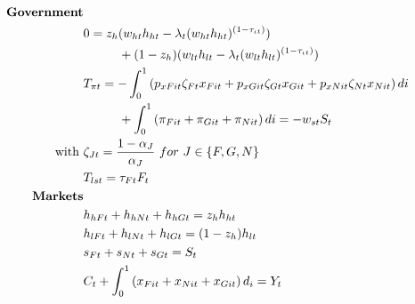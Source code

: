 \begin{align}
\text{\textbf{Government}}&\nonumber\\
&0=z_h(w_{ht}h_{ht}-\lambda_t(w_{ht}h_{ht})^{(1-\tau_{\iota t})})\nonumber \\ &\hspace{10mm}+(1-z_h)(w_{lt}h_{lt}-\lambda_t(w_{lt}h_{lt})^{(1-\tau_{\iota t})})\nonumber\\
&T_{\pi t}= -\int_{0}^{1} \left(p_{xFit}\zeta_{Ft}x_{Fit}+p_{xGit}\zeta_{Gt}x_{Git}+ p_{xNit}\zeta_{Nt}x_{Nit}\right)di\nonumber\\ &\hspace{10mm}+\int_{0}^{1}\left(\pi_{Fit}+\pi_{Git}+\pi_{Nit}\right)di = -w_{st}S_t\nonumber\\
\text{with}\ \vspace{4mm}&\zeta_{Jt}=\frac{1-\alpha_J}{\alpha_J}\ for\  J\in\{F,G,N\}\nonumber \\
& T_{lst}=\tau_{Ft}F_t\nonumber\\
\text{\textbf{Markets}}&\nonumber\\
&h_{hFt}+h_{hNt}+h_{hGt}=z_{h} h_{ht}\nonumber\\
&h_{lFt}+h_{lNt}+h_{lGt}=(1-z_h) h_{lt}\nonumber\\
&s_{Ft}+s_{Nt}+s_{Gt}=S_{t}\nonumber\\
&C_{t}+\int_{0}^{1} \left(x_{Fit}+x_{Nit}+x_{Git}\right)d_i=Y_t\nonumber
\end{align}

